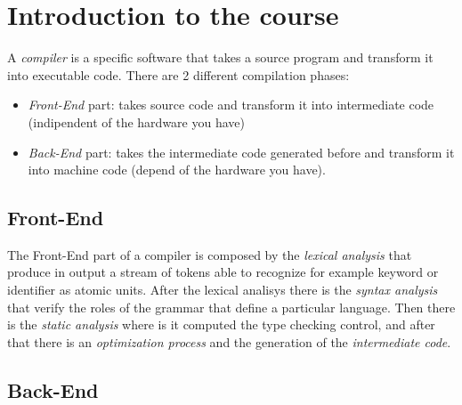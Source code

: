 \chapter{Introduction to the course}

A \textit{compiler} is a specific software that takes a source program and transform it into executable code. There are 2 different compilation phases:
\begin{itemize}
\item \textit{Front-End} part: takes source code and transform it into intermediate code (indipendent of the hardware you have)
\item \textit{Back-End} part: takes the intermediate code generated before and transform it into machine code (depend of the hardware you have).
\end{itemize}

\section{Front-End}

The Front-End part of a compiler is composed by the \textit{lexical analysis} that produce in output a stream of tokens able to recognize for example keyword or identifier as atomic units.
After the lexical analisys there is the \textit{syntax analysis} that verify the roles of the grammar that define a particular language.
Then there is the \textit{static analysis} where is it computed the type checking control, and after that there is an \textit{optimization process} and the generation of the \textit{intermediate code}.







\section{Back-End}

